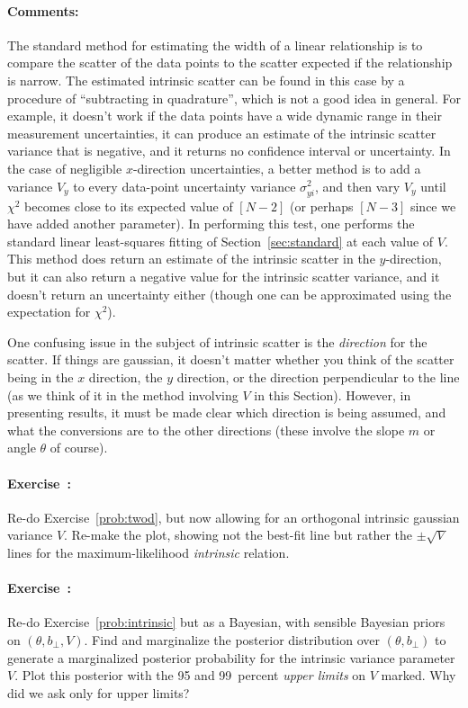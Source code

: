 \documentclass[12pt,twoside]{article}
\newcommand{\sectionname}{Section}
\newcommand{\problemname}{Exercise}
\newcommand{\commentsname}{Comments}
\newcounter{problem}
\newenvironment{problem}{\paragraph{\problemname~\theproblem:}\refstepcounter{problem}}{}
\newenvironment{comments}{\paragraph{\commentsname:}}{}
\newcommand{\bperp}{b_{\perp}}
\begin{document}
\begin{comments}
The standard method for estimating the width of a linear relationship
is to compare the scatter of the data points to the scatter expected
if the relationship is narrow.  The estimated intrinsic scatter can be
found in this case by a procedure of ``subtracting in quadrature'',
which is not a good idea in general.  For example, it doesn't work if
the data points have a wide dynamic range in their measurement
uncertainties, it can produce an estimate of the intrinsic scatter
variance that is negative, and it returns no confidence interval or
uncertainty.  In the case of negligible $x$-direction uncertainties, a
better method is to add a variance $V_y$ to every data-point
uncertainty variance $\sigma_{yi}^2$, and then vary $V_y$ until
$\chi^2$ becomes close to its expected value of $[N-2]$ (or perhaps
$[N-3]$ since we have added another parameter).  In performing this
test, one performs the standard linear least-squares fitting of
\sectionname~\ref{sec:standard} at each value of $V$.  This method
does return an estimate of the intrinsic scatter in the $y$-direction,
but it can also return a negative value for the intrinsic scatter
variance, and it doesn't return an uncertainty either (though one can
be approximated using the expectation for $\chi^2$).

One confusing issue in the subject of intrinsic scatter is the
\emph{direction} for the scatter.  If things are gaussian, it doesn't
matter whether you think of the scatter being in the $x$ direction,
the $y$ direction, or the direction perpendicular to the line (as we
think of it in the method involving $V$ in this \sectionname).
However, in presenting results, it must be made clear which direction
is being assumed, and what the conversions are to the other directions
(these involve the slope $m$ or angle $\theta$ of course).
\end{comments}

\begin{problem}\label{prob:intrinsic}
Re-do \problemname~\ref{prob:twod}, but now allowing for an orthogonal
intrinsic gaussian variance $V$.  Re-make the plot, showing not the
best-fit line but rather the $\pm\sqrt{V}$ lines for the
maximum-likelihood \emph{intrinsic} relation.
\end{problem}

\begin{problem}
Re-do \problemname~\ref{prob:intrinsic} but as a Bayesian, with
sensible Bayesian priors on $(\theta,\bperp,V)$.  Find and marginalize
the posterior distribution over $(\theta,\bperp)$ to generate a
marginalized posterior probability for the intrinsic variance
parameter $V$.  Plot this posterior with the 95 and 99~percent
\emph{upper limits} on $V$ marked.  Why did we ask only for upper
limits?
\end{problem}
\end{document}
